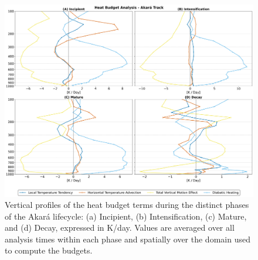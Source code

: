\documentclass[pdflatex,sn-chicago]{sn-jnl}%
\theoremstyle{plain}
\theoremstyle{definition}
\theoremstyle{remark}
\theoremstyle{definition}
\begin{document}
\begin{figure}[h!]
\centering
\includegraphics[width=\textwidth]{Heat_Budget_Combined_2x2.png}
\caption{Vertical profiles of the heat budget terms during the distinct phases of the Akará lifecycle: (a) Incipient, (b) Intensification, (c) Mature, and (d) Decay, expressed in K/day. Values are averaged over all analysis times within each phase and spatially over the domain used to compute the budgets.}
\label{fig:Heat_Budget_Combined_2x2}
\end{figure}
\end{document}
